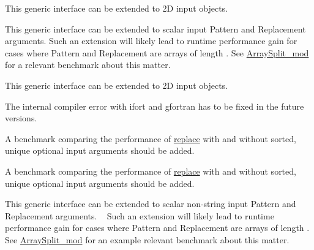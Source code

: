 \begin{DoxyRefList}
\item[Type \mbox{\hyperlink{interfaceArrayRemove__mod_1_1remove}{Array\+Remove\+\_\+mod\+::remove}} ]\label{todo__todo000007}%
%
 This generic interface can be extended to 2D input objects. ~\newline
 
\item[Type \mbox{\hyperlink{interfaceArrayReplace__mod_1_1genReplaced}{Array\+Replace\+\_\+mod\+::gen\+Replaced}} ]\label{todo__todo000009}%
%
 This generic interface can be extended to scalar input {\ttfamily Pattern} and {\ttfamily Replacement} arguments. Such an extension will likely lead to runtime performance gain for cases where {\ttfamily Pattern} and {\ttfamily Replacement} are arrays of length {}. See \mbox{\hyperlink{namespaceArraySplit__mod}{Array\+Split\+\_\+mod}} for a relevant benchmark about this matter. ~\newline


\label{todo__todo000008}%
%
 This generic interface can be extended to 2D input objects. ~\newline


\label{todo__todo000011}%
%
 The internal compiler error with {\ttfamily ifort} and {\ttfamily gfortran} has to be fixed in the future versions. ~\newline


\label{todo__todo000010}%
%
 A benchmark comparing the performance of \mbox{\hyperlink{interfaceArrayReplace__mod_1_1replace}{replace}} with and without {\ttfamily sorted, unique} optional input arguments should be added. 
\item[Type \mbox{\hyperlink{interfaceArrayReplace__mod_1_1replace}{Array\+Replace\+\_\+mod\+::replace}} ]\label{todo__todo000014}%
%
 A benchmark comparing the performance of \mbox{\hyperlink{interfaceArrayReplace__mod_1_1replace}{replace}} with and without {\ttfamily sorted, unique} optional input arguments should be added.

\label{todo__todo000013}%
%
 This generic interface can be extended to scalar non-\/string input {\ttfamily Pattern} and {\ttfamily Replacement} arguments. ~\newline
 Such an extension will likely lead to runtime performance gain for cases where {\ttfamily Pattern} and {\ttfamily Replacement} are arrays of length {}. See \mbox{\hyperlink{namespaceArraySplit__mod}{Array\+Split\+\_\+mod}} for an example relevant benchmark about this matter. ~\newline



\end{DoxyRefList}
